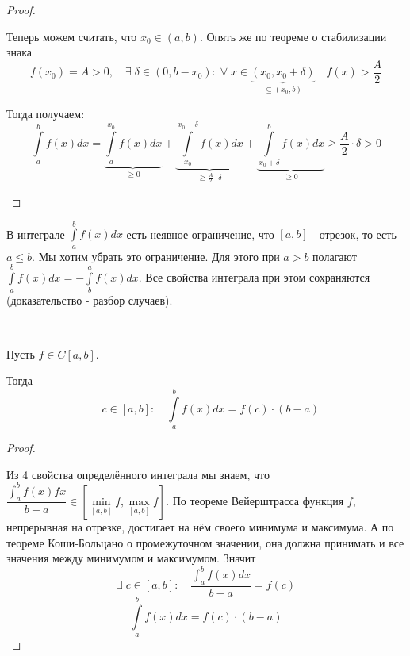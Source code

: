 \documentclass[../main.tex]{subfiles}
\begin{document}
\begin{proof}
\begin{enumerate}
        \par Теперь можем считать, что \( x_0 \in \left( a,b\right)\). Опять же по теореме о стабилизации знака 
        \[ f\left( x_0\right)=A>0,\quad \exists \; \delta \in \left( 0, b-x_0\right): \;\forall \; x \in \underbrace{\left( x_0, x_0+ \delta \right)}_{ \subseteq  \left( x_0, b\right)}\quad f\left( x\right)> \dfrac{ A}{ 2} \]
        \par Тогда получаем:
        \[ \displaystyle\int\limits_{ a}^{ b} f\left( x\right)dx= \underbrace{\displaystyle\int\limits_{ a}^{ x_0} f\left( x\right)dx}_{ \geq 0}+ \underbrace{\displaystyle\int\limits_{ x_0}^{ x_0+ \delta }f\left( x\right)dx }_{ \geq \frac{ A}{ 2} \cdot \delta  }+ \underbrace{\displaystyle\int\limits_{ x_0+ \delta}^{ b}f \left( x\right)dx}_{ \geq 0} \geq \dfrac{ A}{ 2} \cdot \delta >0 \]
    \end{enumerate}
\end{proof}

В интеграле \( \displaystyle\int\limits_{ a}^{ b} f\left( x\right)dx\) есть неявное ограничение, что \( \left[ a,b\right]\) - отрезок, то есть \( a \leq b\). Мы хотим убрать это ограничение. 
Для этого при \( a > b\) полагают \( \displaystyle\int\limits_{ a}^{ b} f\left( x\right)dx = - \displaystyle\int\limits_{ b}^{ a} f\left( x\right)dx\). Все свойства интеграла при этом сохраняются (доказательство - разбор случаев).

\begin{thm}

    ~

    Пусть \( f \in C\left[ a,b\right]\).

    Тогда 
    \[ \exists \; c \in \left[ a,b\right]:\quad \displaystyle\int\limits_{ a}^{ b} f\left( x\right)dx = f\left( c\right) \cdot \left( b-a\right)\]
\end{thm}

\begin{proof}
    
    ~

    Из 4 свойства определённого интеграла мы знаем, что \( \dfrac{ \displaystyle\int_{a}^{b}f\left(x\right)fx}{ b-a} \in \left[ \min\limits_{ \left[ a,b\right]}f, \max\limits_{ \left[ a,b\right]} f \right]\). По теореме Вейерштрасса функция \( f\), непрерывная 
    на отрезке, достигает на нём своего минимума и максимума. А по теореме Коши-Больцано о промежуточном значении, она должна принимать и все значения между минимумом и максимумом. Значит
    \[ \exists \; c \in \left[ a,b\right]:\quad \dfrac{ \displaystyle\int_{a}^{b}f\left(x\right)dx}{ b-a} = f(c)\]
    \[ \displaystyle\int\limits_{ a}^{ b} f\left( x\right)dx = f(c) \cdot \left( b-a\right)\]
\end{proof}
\end{document}
